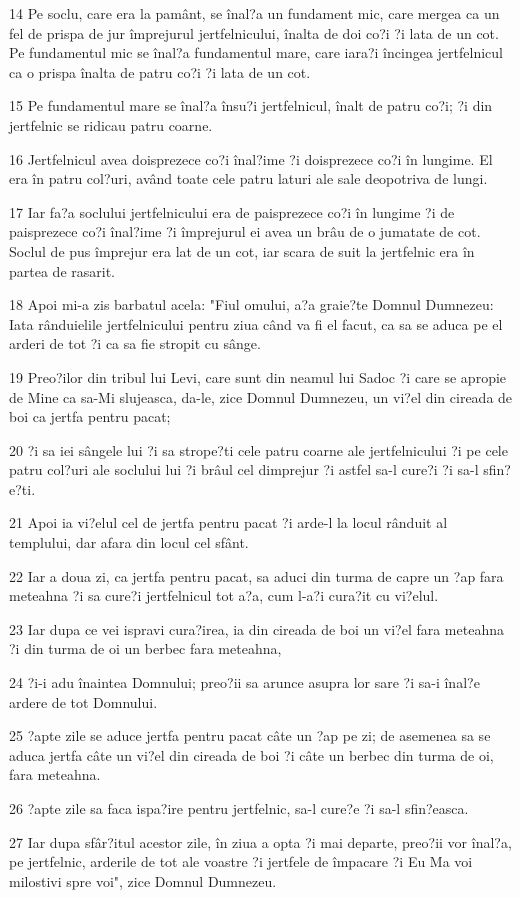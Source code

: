 \par 14 Pe soclu, care era la pamânt, se înal?a un fundament mic, care mergea ca un fel de prispa de jur împrejurul jertfelnicului, înalta de doi co?i ?i lata de un cot. Pe fundamentul mic se înal?a fundamentul mare, care iara?i încingea jertfelnicul ca o prispa înalta de patru co?i ?i lata de un cot.
\par 15 Pe fundamentul mare se înal?a însu?i jertfelnicul, înalt de patru co?i; ?i din jertfelnic se ridicau patru coarne.
\par 16 Jertfelnicul avea doisprezece co?i înal?ime ?i doisprezece co?i în lungime. El era în patru col?uri, având toate cele patru laturi ale sale deopotriva de lungi.
\par 17 Iar fa?a soclului jertfelnicului era de paisprezece co?i în lungime ?i de paisprezece co?i înal?ime ?i împrejurul ei avea un brâu de o jumatate de cot. Soclul de pus împrejur era lat de un cot, iar scara de suit la jertfelnic era în partea de rasarit.
\par 18 Apoi mi-a zis barbatul acela: "Fiul omului, a?a graie?te Domnul Dumnezeu: Iata rânduielile jertfelnicului pentru ziua când va fi el facut, ca sa se aduca pe el arderi de tot ?i ca sa fie stropit cu sânge.
\par 19 Preo?ilor din tribul lui Levi, care sunt din neamul lui Sadoc ?i care se apropie de Mine ca sa-Mi slujeasca, da-le, zice Domnul Dumnezeu, un vi?el din cireada de boi ca jertfa pentru pacat;
\par 20 ?i sa iei sângele lui ?i sa strope?ti cele patru coarne ale jertfelnicului ?i pe cele patru col?uri ale soclului lui ?i brâul cel dimprejur ?i astfel sa-l cure?i ?i sa-l sfin?e?ti.
\par 21 Apoi ia vi?elul cel de jertfa pentru pacat ?i arde-l la locul rânduit al templului, dar afara din locul cel sfânt.
\par 22 Iar a doua zi, ca jertfa pentru pacat, sa aduci din turma de capre un ?ap fara meteahna ?i sa cure?i jertfelnicul tot a?a, cum l-a?i cura?it cu vi?elul.
\par 23 Iar dupa ce vei ispravi cura?irea, ia din cireada de boi un vi?el fara meteahna ?i din turma de oi un berbec fara meteahna,
\par 24 ?i-i adu înaintea Domnului; preo?ii sa arunce asupra lor sare ?i sa-i înal?e ardere de tot Domnului.
\par 25 ?apte zile se aduce jertfa pentru pacat câte un ?ap pe zi; de asemenea sa se aduca jertfa câte un vi?el din cireada de boi ?i câte un berbec din turma de oi, fara meteahna.
\par 26 ?apte zile sa faca ispa?ire pentru jertfelnic, sa-l cure?e ?i sa-l sfin?easca.
\par 27 Iar dupa sfâr?itul acestor zile, în ziua a opta ?i mai departe, preo?ii vor înal?a, pe jertfelnic, arderile de tot ale voastre ?i jertfele de împacare ?i Eu Ma voi milostivi spre voi", zice Domnul Dumnezeu.

